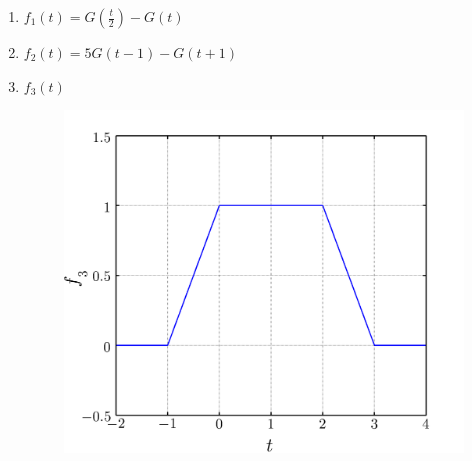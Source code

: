 \documentclass[a4paper,12pt,final]{article}
\begin{document}
      \begin{enumerate}[label=\alph*)]
        \item $f_1\left(t\right) = G\left(\frac{t}{2}\right) - G\left(t\right)$
        \item $f_2\left(t\right) = 5G\left(t-1\right) - G\left(t+1\right)$
      \end{enumerate}\vspace{-1.35em}
      \noindent\begin{minipage}[t]{0.5\textwidth}
        \begin{enumerate}[label=\alph*)]
          \setcounter{enumi}{2}
          \item $f_3\left(t\right)$
          \vspace{-1.0em}
            \begin{figure}[H]
              \begin{flushright}
                \includegraphics[width=\textwidth-30pt]{./laboratorio_4/problema01_f3.png}
              \end{flushright}
            \end{figure}\vspace{-1.0em}
        \end{enumerate}
      \end{minipage}%
\end{document}
